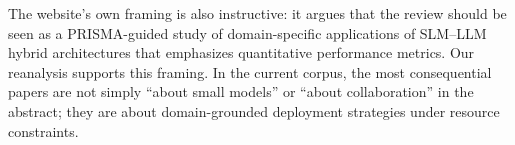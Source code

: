 The website's own framing is also instructive: it argues that the review should be seen as a PRISMA-guided study of domain-specific applications of SLM--LLM hybrid architectures that emphasizes quantitative performance metrics. Our reanalysis supports this framing. In the current corpus, the most consequential papers are not simply ``about small models'' or ``about collaboration'' in the abstract; they are about domain-grounded deployment strategies under resource constraints.
